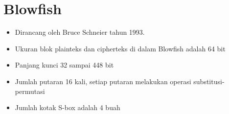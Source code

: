 \documentclass{article}
\begin{document}

\section*{Blowfish}

\begin{itemize}
    \item Dirancang oleh Bruce Schneier tahun 1993.
    \item Ukuran blok plainteks dan cipherteks di dalam Blowfish adalah 64 bit
    \item Panjang kunci 32 sampai 448 bit
    \item Jumlah putaran 16 kali, setiap putaran melakukan operasi substitusi-permutasi
    \item Jumlah kotak S-box adalah 4 buah
\end{itemize}
\end{document}
